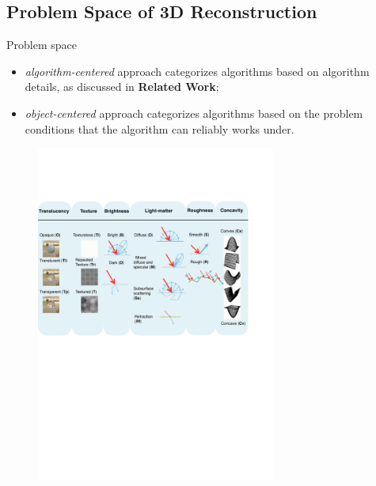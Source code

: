 \documentclass[10pt]{beamer}
\begin{document}
\subsection{Problem Space of 3D Reconstruction}
\begin{frame}{Problem space}

\begin{itemize}
\item \textit{algorithm-centered} approach categorizes algorithms based on algorithm details, as discussed in \textbf{Related Work};
\item \textit{object-centered} approach categorizes algorithms based on the problem conditions that the algorithm can reliably works under.
\end{itemize}

\begin{figure}
\includegraphics[width=0.7\textwidth]{prob_space/obj_class}
\end{figure}

\end{frame}
\end{document}

